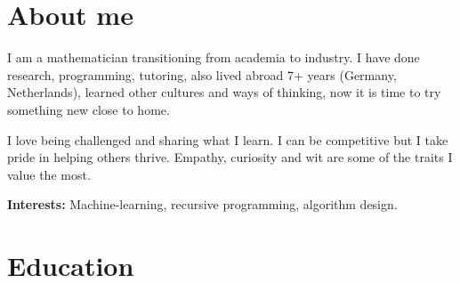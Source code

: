 \documentclass[a4paper,11pt]{twentysecondcv} %
\begin{document}
\section{About me} 
	\begin{onehalfspace}
		I am a mathematician transitioning from academia to industry.\newline
		I have done research, programming, tutoring, also lived abroad 7+ years (Germany, Netherlands), learned other cultures and ways of thinking, now it is time to try something new close to home.
		
		
		I love being challenged and sharing what I learn.
		I can be competitive but I take pride in helping others thrive. Empathy, curiosity and wit are some of the traits I value the most.
		
		\textbf{Interests:} Machine-learning, recursive programming, algorithm design.
	\end{onehalfspace}

\section{Education}

\begin{twenty} %
\end{twenty}
\end{document}
